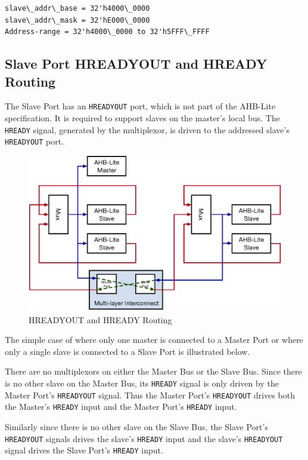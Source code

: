 \begin{verbatim}
slave\_addr\_base = 32'h4000\_0000
slave\_addr\_mask = 32'hE000\_0000
Address-range = 32'h4000\_0000 to 32'h5FFF\_FFFF
\end{verbatim}

\subsection{Slave Port HREADYOUT and HREADY
Routing}\label{slave-port-hreadyout-and-hready-routing}

The Slave Port has an \texttt{HREADYOUT} port, which is not part of the AHB-Lite
specification. It is required to support slaves on the master's local
bus. The \texttt{HREADY} signal, generated by the multiplexor, is driven to the
addressed slave's \texttt{HREADYOUT} port.

\begin{figure}[htb]
	\centering
	\includegraphics[]{assets/img/ahb-lite-switch-sys4}
	\caption{HREADYOUT and HREADY Routing}
	\label{fig:hready-hready-routing}
\end{figure}

The simple case of where only one master is connected to a Master Port
or where only a single slave is connected to a Slave Port is illustrated
below.

There are no multiplexors on either the Master Bus or the Slave Bus.
Since there is no other slave on the Master Bus, its \texttt{HREADY} signal is
only driven by the Master Port's \texttt{HREADYOUT} signal. Thus the Master
Port's \texttt{HREADYOUT} drives both the Master's \texttt{HREADY} input and the Master
Port's \texttt{HREADY} input.

Similarly since there is no other slave on the Slave Bus, the Slave
Port's \texttt{HREADYOUT} signals drives the slave's \texttt{HREADY} input and the slave's
\texttt{HREADYOUT} signal drives the Slave Port's \texttt{HREADY} input.

